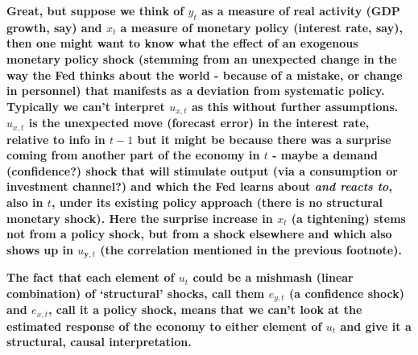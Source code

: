 \documentclass[authoryear,11pt]{elsarticle}
\begin{document}
\textbf{Great, but suppose we think of $y_{t}$ as a measure of real activity (GDP growth, say) and $x_{t}$ a measure of monetary policy (interest rate, say), then one might want to know what the effect of an exogenous monetary policy shock (stemming from an unexpected change in the way the Fed thinks about the world - because of a mistake, or change in personnel) that manifests as a deviation from systematic policy. Typically we can't interpret $u_{x,t}$ as this without further assumptions. $u_{x,t}$ is the unexpected move (forecast error) in the interest rate, relative to info in $t-1$ but it might be because there was a surprise coming from another part of the economy in $t$ - maybe a demand (confidence?) shock that will stimulate output (via a consumption or investment channel?) and which the Fed learns about \textit{and reacts to}, also in $t$, under its existing policy approach (there is no structural monetary shock). Here the surprise increase in $x_{t}$ (a tightening) stems not from a policy shock, but from a shock elsewhere and which also shows up in $u_{\textbf{y},t}$ (the correlation mentioned in the previous footnote).}

\textbf{The fact that each element of $u_{t}$ could be a mishmash (linear combination) of `structural' shocks, call them $e_{y,t}$ (a confidence shock) and $e_{x,t}$, call it a policy shock, means that we can't look at the estimated response of the economy to either element of $u_{t}$ and give it a structural, causal interpretation.}
\end{document}
